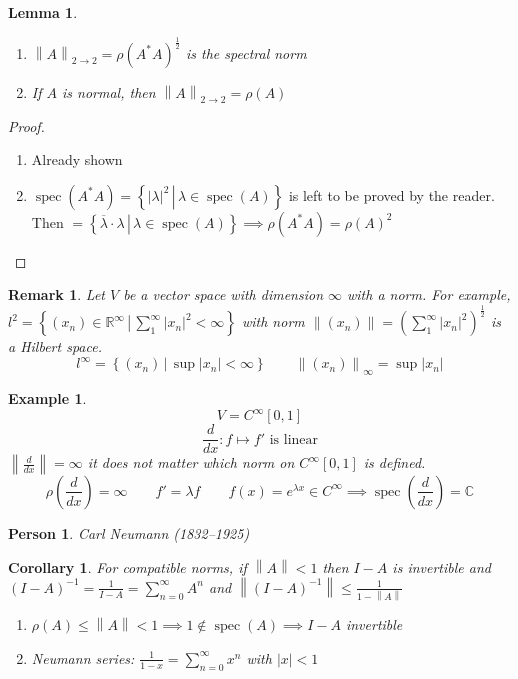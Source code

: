\documentclass[a4paper]{article}
\newcounter{lecref}[section]
\numberwithin{lecref}{section}
\newtheorem*{Example}{Example}
\newtheorem{lemma}[lecref]{Lemma}
\newtheorem{remark}[lecref]{Remark}
\newtheorem{corollary}[lecref]{Corollary}
\newtheorem*{Person}{Person}
\newcommand{\setdef}[2]{\left\{\left.#1\,\right|\,#2\right\}}
\newcommand{\norm}[1]{\left\|#1\right\|}
\newcommand{\card}[1]{\left|#1\right|}
\begin{document}
\begin{lemma} %
  \begin{enumerate}
    \item $\norm{A}_{2\to2} = \rho(A^* A)^{\frac12}$ is the \emph{spectral norm}
    \item If $A$ is normal, then $\norm{A}_{2\to2} = \rho(A)$
  \end{enumerate}
\end{lemma}

\begin{proof}
  \begin{enumerate}
    \item Already shown
    \item $\operatorname{spec}(A^* A) = \setdef{\card{\lambda}^2}{\lambda \in \operatorname{spec}(A)}$ is left to be proved by the reader. Then $= \setdef{\overline\lambda \cdot \lambda}{\lambda \in \operatorname{spec}(A)} \implies \rho(A^* A) = \rho(A)^2$
  \end{enumerate}
\end{proof}

\begin{remark} %
  Let $V$ be a vector space with dimension $\infty$ with a norm.
  For example, $l^2 = \setdef{(x_n) \in \mathbb R^\infty}{\sum_1^\infty \card{x_n}^2 < \infty}$
  with norm $\norm{(x_n)} = \left(\sum_1^\infty \card{x_n}^2\right)^{\frac12}$ is a \emph{Hilbert space}.
  \[ l^\infty = \setdef{(x_n)}{\sup\card{x_n} < \infty} \qquad \norm{(x_n)}_{\infty} = \sup\card{x_n} \]
\end{remark}

\begin{Example}
  \[ V = C^{\infty}[0,1] \]
  \[ \frac d{dx}: f \mapsto f' \text{ is linear} \]
  $\norm{\frac{d}{dx}} = \infty$ it does not matter which norm on $C^{\infty}[0,1]$ is defined.
  \[ \rho\left(\frac d{dx}\right) = \infty \qquad f' = \lambda f \qquad f(x) = e^{\lambda x} \in C^\infty \implies \operatorname{spec}\left(\frac{d}{dx}\right) = \mathbb C \]
\end{Example}

\begin{Person}
  Carl Neumann (1832--1925)
\end{Person}

\begin{corollary} %
  \label{cor1410}
  For compatible norms, if $\norm{A} < 1$ then $I - A$ is invertible and $(I - A)^{-1} = \frac{1}{I - A} = \sum_{n=0}^\infty A^n$ and $\norm{(I - A)^{-1}} \leq \frac{1}{1 - \norm{A}}$

  \begin{enumerate}
    \item $\rho(A) \leq \norm{A} < 1 \implies 1 \not\in \operatorname{spec}(A) \implies I - A$ invertible
    \item Neumann series: $\frac{1}{1 - x} = \sum_{n=0}^\infty x^n$ with $\card{x} < 1$
  \end{enumerate}
\end{corollary}
\end{document}
